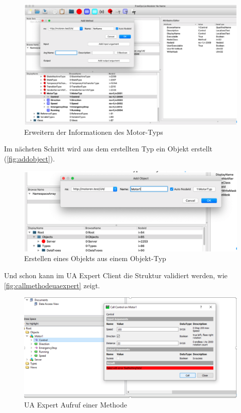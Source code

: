 \begin{figure}[H]
	\centering
	\includegraphics[width=1\linewidth]{abb/ERweitertMotorTy}
	\caption{Erweitern der Informationen des Motor-Typs}
	\label{fig:erweitertmotorty}
\end{figure}
Im nächsten Schritt wird aus dem erstellten Typ ein Objekt erstellt (\autoref{fig:addobject}).
\begin{figure}[H]
	\centering
	\includegraphics[width=1\linewidth]{abb/AddObject}
	\caption{Erstellen eines Objekts aus einem Objekt-Typ}
	\label{fig:addobject}
\end{figure}
Und schon kann im UA Expert Client die Struktur validiert werden, wie \autoref{fig:callmethodeuaexpert} zeigt.
\begin{figure}[H]
	\centering
	\includegraphics[width=1\linewidth]{abb/CallMethodeUAExpert}
	\caption{UA Expert Aufruf einer Methode}
	\label{fig:callmethodeuaexpert}
\end{figure}
